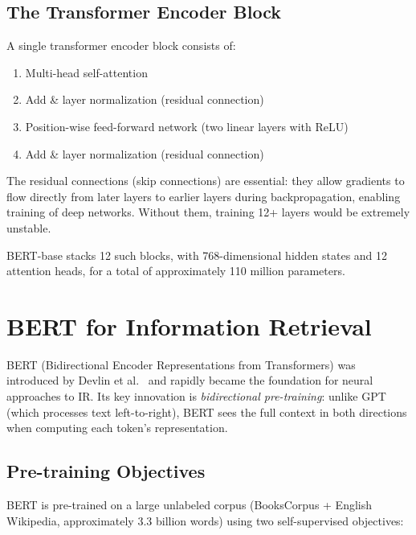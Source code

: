 \documentclass[11pt,a4paper]{article}
\theoremstyle{definition}
\theoremstyle{plain}
\begin{document}
\subsection{The Transformer Encoder Block}

A single transformer encoder block consists of:
\begin{enumerate}
    \item Multi-head self-attention
    \item Add \& layer normalization (residual connection)
    \item Position-wise feed-forward network (two linear layers with ReLU)
    \item Add \& layer normalization (residual connection)
\end{enumerate}

The residual connections (skip connections) are essential: they allow gradients to flow directly from later layers to earlier layers during backpropagation, enabling training of deep networks. Without them, training 12+ layers would be extremely unstable.

BERT-base stacks 12 such blocks, with 768-dimensional hidden states and 12 attention heads, for a total of approximately 110 million parameters.


\section{BERT for Information Retrieval}
\label{sec:bert-ir}

BERT (Bidirectional Encoder Representations from Transformers) was introduced by Devlin et al.~\cite{devlin2019bert} and rapidly became the foundation for neural approaches to IR. Its key innovation is \emph{bidirectional pre-training}: unlike GPT (which processes text left-to-right), BERT sees the full context in both directions when computing each token's representation.

\subsection{Pre-training Objectives}

BERT is pre-trained on a large unlabeled corpus (BooksCorpus + English Wikipedia, approximately 3.3 billion words) using two self-supervised objectives:
\end{document}
